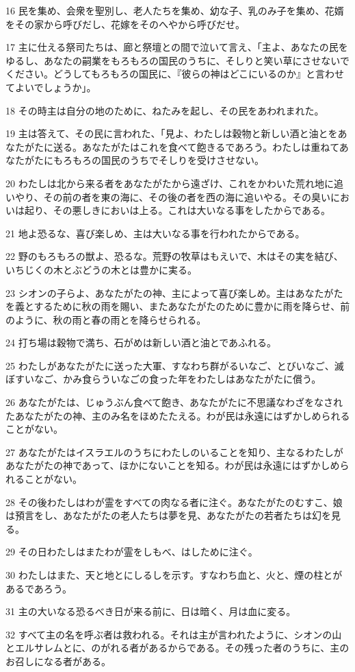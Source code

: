 \par 16 民を集め、会衆を聖別し、老人たちを集め、幼な子、乳のみ子を集め、花婿をその家から呼びだし、花嫁をそのへやから呼びだせ。
\par 17 主に仕える祭司たちは、廊と祭壇との間で泣いて言え、「主よ、あなたの民をゆるし、あなたの嗣業をもろもろの国民のうちに、そしりと笑い草にさせないでください。どうしてもろもろの国民に、『彼らの神はどこにいるのか』と言わせてよいでしょうか」。
\par 18 その時主は自分の地のために、ねたみを起し、その民をあわれまれた。
\par 19 主は答えて、その民に言われた、「見よ、わたしは穀物と新しい酒と油とをあなたがたに送る。あなたがたはこれを食べて飽きるであろう。わたしは重ねてあなたがたにもろもろの国民のうちでそしりを受けさせない。
\par 20 わたしは北から来る者をあなたがたから遠ざけ、これをかわいた荒れ地に追いやり、その前の者を東の海に、その後の者を西の海に追いやる。その臭いにおいは起り、その悪しきにおいは上る。これは大いなる事をしたからである。
\par 21 地よ恐るな、喜び楽しめ、主は大いなる事を行われたからである。
\par 22 野のもろもろの獣よ、恐るな。荒野の牧草はもえいで、木はその実を結び、いちじくの木とぶどうの木とは豊かに実る。
\par 23 シオンの子らよ、あなたがたの神、主によって喜び楽しめ。主はあなたがたを義とするために秋の雨を賜い、またあなたがたのために豊かに雨を降らせ、前のように、秋の雨と春の雨とを降らせられる。
\par 24 打ち場は穀物で満ち、石がめは新しい酒と油とであふれる。
\par 25 わたしがあなたがたに送った大軍、すなわち群がるいなご、とびいなご、滅ぼすいなご、かみ食らういなごの食った年をわたしはあなたがたに償う。
\par 26 あなたがたは、じゅうぶん食べて飽き、あなたがたに不思議なわざをなされたあなたがたの神、主のみ名をほめたたえる。わが民は永遠にはずかしめられることがない。
\par 27 あなたがたはイスラエルのうちにわたしのいることを知り、主なるわたしがあなたがたの神であって、ほかにないことを知る。わが民は永遠にはずかしめられることがない。
\par 28 その後わたしはわが霊をすべての肉なる者に注ぐ。あなたがたのむすこ、娘は預言をし、あなたがたの老人たちは夢を見、あなたがたの若者たちは幻を見る。
\par 29 その日わたしはまたわが霊をしもべ、はしために注ぐ。
\par 30 わたしはまた、天と地とにしるしを示す。すなわち血と、火と、煙の柱とがあるであろう。
\par 31 主の大いなる恐るべき日が来る前に、日は暗く、月は血に変る。
\par 32 すべて主の名を呼ぶ者は救われる。それは主が言われたように、シオンの山とエルサレムとに、のがれる者があるからである。その残った者のうちに、主のお召しになる者がある。


